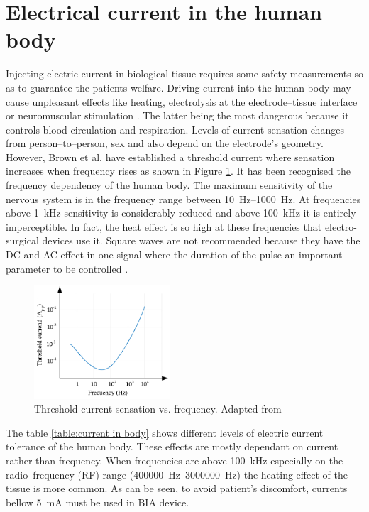 \section{Electrical current in the human body} %
\label{section impedance current in body}
Injecting electric current in biological tissue requires some safety measurements so as to guarantee the patients welfare. Driving current into the human body may cause unpleasant effects like heating, electrolysis at the electrode–tissue interface or neuromuscular stimulation \cite{bertemes2002tissue, martinsen2011bioimpedance}. The latter being the most dangerous because it controls blood circulation and respiration. Levels of current sensation changes from person–to–person, sex and also depend on the electrode’s geometry. However, Brown et al. \cite{brown1998medical} have established a threshold current where sensation increases when frequency rises as shown in Figure \ref{fig:threshold sensation}.  It has been recognised the frequency dependency of the human body. The maximum sensitivity of the nervous system is in the frequency range between \SIrange[scientific-notation = engineering]{10}{1000}{\hertz}. At frequencies above \SI{1}{\kilo\hertz} sensitivity is considerably reduced and above \SI{100}{\kilo\hertz} it is entirely imperceptible. In fact, the heat effect is so high at these frequencies that electro-surgical devices use it. Square waves are not recommended because they have the DC and AC effect in one signal where the duration of the pulse an important parameter to be controlled \cite{martinsen2011bioimpedance}.

\begin{figure}[!htpb]
	\centering
	\includegraphics[width=0.45\textwidth,keepaspectratio]{figure14}    
	\caption[Threshold current sensation vs. frequency]{Threshold current sensation vs. frequency. Adapted from \cite{brown1998medical}}
	\label{fig:threshold sensation}
\end{figure}

The table \ref{table:current in body} shows different levels of electric current tolerance of the human body. These effects are mostly dependant on current rather than frequency. When frequencies are above \SI{100}{\kilo\hertz} especially on the radio–frequency (RF) range (\SIrange[scientific-notation = engineering]{400000}{3000000}{\hertz}) the heating effect of the tissue is more common. As can be seen, to avoid patient’s discomfort, currents bellow \SI{5}{\milli\ampere} must be used in BIA device.

